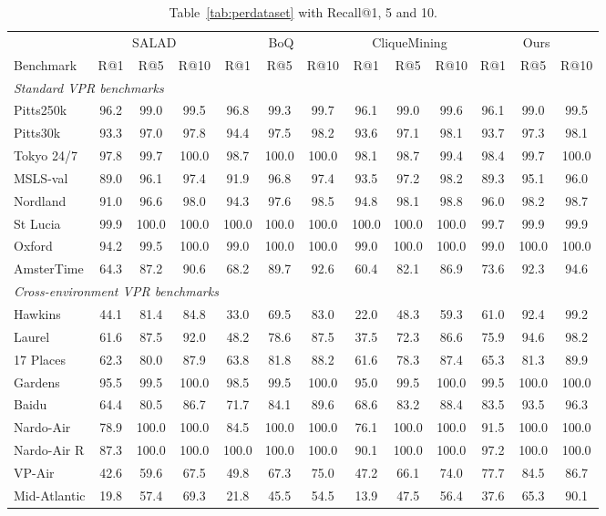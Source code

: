 \begin{table}[H]
\caption{Table~\ref{tab:perdataset} with Recall@1, 5 and 10.}
\label{tab:recallk-backbone}
\centering
{\scriptsize\setlength{\tabcolsep}{3pt}
\begin{tabular}{l ccc ccc ccc ccc}
\toprule
& \multicolumn{3}{c}{SALAD} & \multicolumn{3}{c}{BoQ} & \multicolumn{3}{c}{CliqueMining} & \multicolumn{3}{c}{Ours} \\
\cmidrule(lr){2-4}\cmidrule(lr){5-7}\cmidrule(lr){8-10}\cmidrule(lr){11-13}
Benchmark & R@1 & R@5 & R@10 & R@1 & R@5 & R@10 & R@1 & R@5 & R@10 & R@1 & R@5 & R@10 \\
\midrule
\multicolumn{13}{l}{\emph{Standard VPR benchmarks}} \\
Pitts250k & 96.2 & 99.0 & 99.5 & 96.8 & 99.3 & 99.7 & 96.1 & 99.0 & 99.6 & 96.1 & 99.0 & 99.5 \\
Pitts30k & 93.3 & 97.0 & 97.8 & 94.4 & 97.5 & 98.2 & 93.6 & 97.1 & 98.1 & 93.7 & 97.3 & 98.1 \\
Tokyo 24/7 & 97.8 & 99.7 & 100.0 & 98.7 & 100.0 & 100.0 & 98.1 & 98.7 & 99.4 & 98.4 & 99.7 & 100.0 \\
MSLS-val & 89.0 & 96.1 & 97.4 & 91.9 & 96.8 & 97.4 & 93.5 & 97.2 & 98.2 & 89.3 & 95.1 & 96.0 \\
Nordland & 91.0 & 96.6 & 98.0 & 94.3 & 97.6 & 98.5 & 94.8 & 98.1 & 98.8 & 96.0 & 98.2 & 98.7 \\
St Lucia & 99.9 & 100.0 & 100.0 & 100.0 & 100.0 & 100.0 & 100.0 & 100.0 & 100.0 & 99.7 & 99.9 & 99.9 \\
Oxford & 94.2 & 99.5 & 100.0 & 99.0 & 100.0 & 100.0 & 99.0 & 100.0 & 100.0 & 99.0 & 100.0 & 100.0 \\
AmsterTime & 64.3 & 87.2 & 90.6 & 68.2 & 89.7 & 92.6 & 60.4 & 82.1 & 86.9 & 73.6 & 92.3 & 94.6 \\
\midrule
\multicolumn{13}{l}{\emph{Cross-environment VPR benchmarks}} \\
Hawkins & 44.1 & 81.4 & 84.8 & 33.0 & 69.5 & 83.0 & 22.0 & 48.3 & 59.3 & 61.0 & 92.4 & 99.2 \\
Laurel & 61.6 & 87.5 & 92.0 & 48.2 & 78.6 & 87.5 & 37.5 & 72.3 & 86.6 & 75.9 & 94.6 & 98.2 \\
17 Places & 62.3 & 80.0 & 87.9 & 63.8 & 81.8 & 88.2 & 61.6 & 78.3 & 87.4 & 65.3 & 81.3 & 89.9 \\
Gardens & 95.5 & 99.5 & 100.0 & 98.5 & 99.5 & 100.0 & 95.0 & 99.5 & 100.0 & 99.5 & 100.0 & 100.0 \\
Baidu & 64.4 & 80.5 & 86.7 & 71.7 & 84.1 & 89.6 & 68.6 & 83.2 & 88.4 & 83.5 & 93.5 & 96.3 \\
Nardo-Air & 78.9 & 100.0 & 100.0 & 84.5 & 100.0 & 100.0 & 76.1 & 100.0 & 100.0 & 91.5 & 100.0 & 100.0 \\
Nardo-Air R & 87.3 & 100.0 & 100.0 & 100.0 & 100.0 & 100.0 & 90.1 & 100.0 & 100.0 & 97.2 & 100.0 & 100.0 \\
VP-Air & 42.6 & 59.6 & 67.5 & 49.8 & 67.3 & 75.0 & 47.2 & 66.1 & 74.0 & 77.7 & 84.5 & 86.7 \\
Mid-Atlantic & 19.8 & 57.4 & 69.3 & 21.8 & 45.5 & 54.5 & 13.9 & 47.5 & 56.4 & 37.6 & 65.3 & 90.1 \\
\bottomrule
\end{tabular}}
\end{table}

